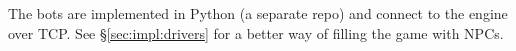 The bots are implemented in Python (a separate repo) and connect to the
engine over TCP\@.
See \S\ref{sec:impl:drivers} for a better way of filling the game
with NPCs.
